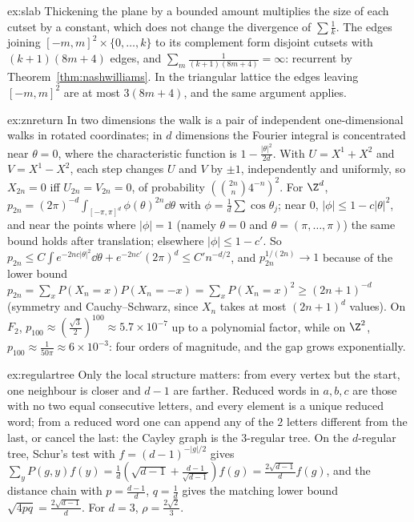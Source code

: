 \begin{solution}{ex:slab}
\idea Thickening the plane by a bounded amount multiplies the size of each cutset by a constant, which does not change the divergence of $\sum\frac1k$.
\writeup The edges joining $[-m,m]^2\times\{0,\dots,k\}$ to its complement form disjoint cutsets with $(k+1)(8m+4)$ edges, and $\sum_m\frac1{(k+1)(8m+4)}=\infty$: recurrent by Theorem~\ref{thm:nashwilliams}. In the triangular lattice the
edges leaving $[-m,m]^2$ are at most $3(8m+4)$, and the same argument applies.
\end{solution}

\begin{solution}{ex:znreturn}
\idea In two dimensions the walk is a pair of independent one-dimensional walks in rotated coordinates; in $d$ dimensions the Fourier integral is concentrated near $\theta=0$, where the characteristic function is $1-\frac{|\theta|^2}{2d}$.
\writeup With $U=X^1+X^2$ and $V=X^1-X^2$, each step changes $U$ and $V$ by $\pm1$, independently and uniformly, so $X_{2n}=0$ iff $U_{2n}=V_{2n}=0$, of probability $(\binom{2n}n4^{-n})^2$. For $\Z^d$, $p_{2n}=(2\pi)^{-d}\int_{[-\pi,\pi]^d}\phi(\theta)^{2n}\dd\theta$
with $\phi=\frac1d\sum\cos\theta_j$; near $0$, $|\phi|\le1-c|\theta|^2$, and near the points where $|\phi|=1$ (namely $\theta=0$ and $\theta=(\pi,\dots,\pi)$) the same bound holds after translation; elsewhere $|\phi|\le1-c'$. So
$p_{2n}\le C\int e^{-2nc|\theta|^2}\dd\theta+e^{-2nc'}(2\pi)^d\le C'n^{-d/2}$, and $p_{2n}^{1/(2n)}\to1$ because of the lower bound $p_{2n}=\sum_xP(X_n=x)P(X_n=-x)=\sum_xP(X_n=x)^2\ge(2n+1)^{-d}$ (symmetry and Cauchy--Schwarz, since $X_n$ takes at most $(2n+1)^d$ values). On $F_2$, $p_{100}\approx(\frac{\sqrt3}2)^{100}\approx5.7\times10^{-7}$ up to a polynomial factor, while on $\Z^2$, $p_{100}\approx\frac1{50\pi}\approx6\times10^{-3}$: four orders of magnitude, and the gap grows exponentially.
\end{solution}

\begin{solution}{ex:regulartree}
\idea Only the local structure matters: from every vertex but the start, one neighbour is closer and $d-1$ are farther.
\writeup Reduced words in $a,b,c$ are those with no two equal consecutive letters, and every element is a unique reduced word; from a reduced word one can append any of the $2$ letters different from the last, or cancel the
last: the Cayley graph is the $3$-regular tree. On the $d$-regular tree, Schur's test with $f=(d-1)^{-|g|/2}$ gives $\sum_yP(g,y)f(y)=\frac1d(\sqrt{d-1}+\frac{d-1}{\sqrt{d-1}})f(g)=\frac{2\sqrt{d-1}}df(g)$, and the distance chain with
$p=\frac{d-1}d$, $q=\frac1d$ gives the matching lower bound $\sqrt{4pq}=\frac{2\sqrt{d-1}}d$. For $d=3$, $\rho=\frac{2\sqrt2}3$.
\end{solution}

